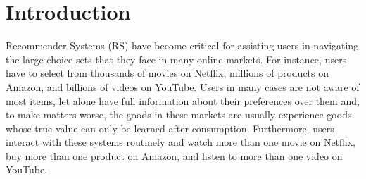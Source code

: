 \documentclass[sigconf]{acmart}
\begin{document}
%
%
\author{Guy Aridor}

\author{Duarte Gon\c{c}alves}
  
  \author{Shan Sikdar}
%

%

\maketitle

\section{Introduction}

Recommender Systems (RS) have become critical for assisting users in navigating the large choice sets that they face in many online markets. For instance, users have to select from thousands of movies on Netflix, millions of products on Amazon, and billions of videos on YouTube. Users in many cases are not aware of most items, let alone have full information about their preferences over them and, to make matters worse, the goods in these markets are usually experience goods whose true value can only be learned after consumption. Furthermore, users interact with these systems routinely and watch more than one movie on Netflix, buy more than one product on Amazon, and listen to more than one video on YouTube.
\par
\end{document}
